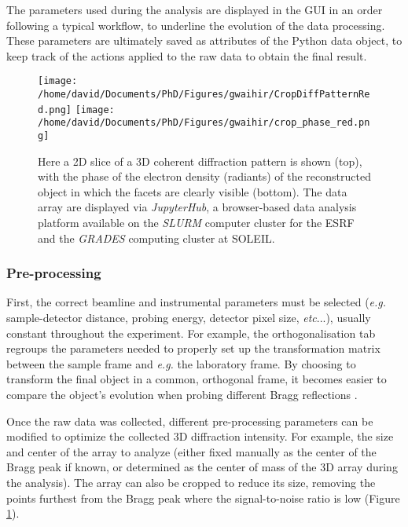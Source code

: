 The parameters used during the analysis are displayed in the GUI in an order following a typical workflow, to underline the evolution of the data processing.
These parameters are ultimately saved as attributes of the Python data object, to keep track of the actions applied to the raw data to obtain the final result.

\begin{figure}[!htb]
    \centering
    \texttt{[image: /home/david/Documents/PhD/Figures/gwaihir/CropDiffPatternRed.png]}
    \texttt{[image: /home/david/Documents/PhD/Figures/gwaihir/crop\_phase\_red.png]}
    \caption{
    Here a 2D slice of a 3D coherent diffraction pattern is shown (top), with the phase of the electron density (radiants) of the reconstructed object in which the facets are clearly visible (bottom). The data array are displayed via \textit{JupyterHub}, a browser-based data analysis platform available on the \textit{SLURM} computer cluster for the ESRF and the \textit{GRADES} computing cluster at SOLEIL.
    }
    \label{fig:GUI_file}
\end{figure}

\subsubsection{Pre-processing}
First, the correct beamline and instrumental parameters must be selected (\textit{e.g.} sample-detector distance, probing energy, detector pixel size, \textit{etc}...), usually constant throughout the experiment. For example, the orthogonalisation tab regroups the parameters needed to properly set up the transformation matrix between the sample frame and \textit{e.g.} the laboratory frame. By choosing to transform the final object in a common, orthogonal frame, it becomes easier to compare the object's evolution when probing different Bragg reflections \cite{crystal_sarah}.

Once the raw data was collected, different pre-processing parameters can be modified to optimize the collected 3D diffraction intensity. For example, the size and center of the array to analyze (either fixed manually as the center of the Bragg peak if known, or determined as the center of mass of the 3D array during the analysis). The array can also be cropped to reduce its size, removing the points furthest from the Bragg peak where the signal-to-noise ratio is low (Figure \ref{fig:GUI_file}).

